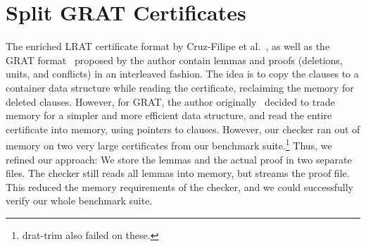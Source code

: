 \documentclass{llncs}
\begin{document}
\section{Split GRAT Certificates}
The enriched LRAT certificate format by Cruz-Filipe et al.~\cite{CHHKS17}, as well as the GRAT format~\cite{La17_CADE} proposed by 
the author contain lemmas and proofs (deletions, units, and conflicts) in an interleaved fashion. 
The idea is to copy the clauses to a container data structure while reading the certificate, reclaiming the memory for deleted clauses.
However, for GRAT, the author originally~\cite{La17_CADE} decided to trade memory for a simpler and more efficient data structure, and read the entire certificate into memory, using pointers 
to clauses. However, our checker ran out of memory on two very large certificates from our benchmark suite.\footnote{drat-trim also failed on these.}
Thus, we refined our approach: We store the lemmas and the actual proof in two separate files. 
The checker still reads all lemmas into memory, but streams the proof file. This reduced the memory requirements of the checker, and we could 
successfully verify our whole benchmark suite.
\end{document}
